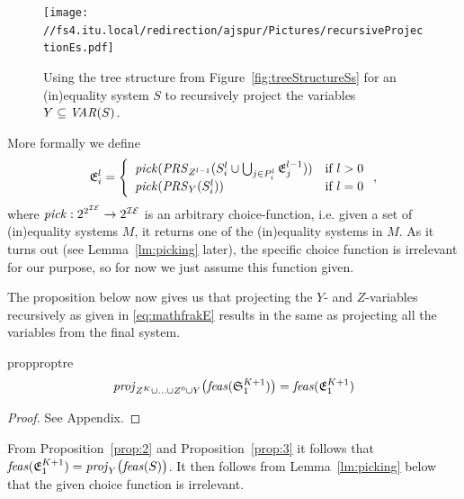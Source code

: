 \begin{figure}
	\centering
		\texttt{[image: //fs4.itu.local/redirection/ajspur/Pictures/recursiveProjectionEs.pdf]}
	\caption{Using the tree structure from Figure~\ref{fig:treeStructureSs} for an (in)equality system $S$ to recursively project the variables $Y\subseteq \mathit{VAR}(S)$.}
	\label{fig:recursiveProjectionEs}
\end{figure}

\noindent More formally we define   
\begin{equation}\label{eq:mathfrakE}
\mathfrak{E}^l_i = \left\{\begin{array}{ll}
		\mathit{pick}(\mathit{PRS}_{Z^{l-1}}(S^l_i \cup\bigcup_{j\in P^l_i}\mathfrak{E}^{l-1}
		_j)) &\text{if }l>0\\
		\mathit{pick}(\mathit{PRS}_{Y}(S^l_i))&\text{if } l = 0
\end{array}\right.,
\end{equation}
where $\mathit{pick}: 2^{2^{\mathcal{IE}}}\to 2^{\mathcal{IE}}$ is an arbitrary choice-function, i.e. given a set of (in)equality systems $M$, it returns one of the (in)equality systems in $M$. As it turns out (see Lemma~\ref{lm:picking} later), the specific choice function is irrelevant for our purpose, so for now we just assume this function given.

The proposition below now gives us that projecting the $Y$- and $Z$-variables recursively as given in \eqref{eq:mathfrakE} results in the same as projecting all the variables from the final system. 
%
\begin{restatable}{prop}{proptre}\label{prop:3}
\[
\mathit{proj}_{Z^{K}\cup \ldots \cup Z^0\cup Y}\big(\mathit{feas}(\mathfrak{S}^{K+1}_1)\big) = \mathit{feas}(\mathfrak{E}^{K+1}_1)
\]
\end{restatable}
\begin{proof}
See Appendix.
\end{proof}
%

From Proposition~\ref{prop:2} and Proposition~\ref{prop:3} it follows that $\mathit{feas}(\mathfrak{E}^{K+1}_1)=\mathit{proj}_Y\big(\mathit{feas}(S)\big)$. It then follows from Lemma~\ref{lm:picking} below that the given choice function is irrelevant.

